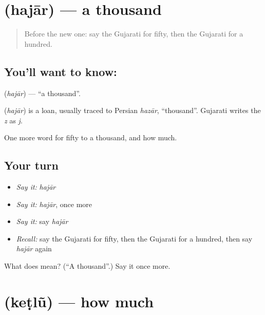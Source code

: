 \section[\texorpdfstring{\gu{હજાર} (hajār)}{હજાર (hajār)}]{ (hajār) — a thousand}

\label{lesson:GU-C83-thousand}



\begin{quote}
Before the new one: say the Gujarati for fifty, then the Gujarati for a hundred.
\end{quote}

\subsection*{You'll want to know: }
\textbf{} (\emph{hajār}) — \textquotedblleft{}a thousand\textquotedblright{}.

\begin{cousinweb}
\textbf{} (\emph{hajār}) is a loan, usually traced to Persian \emph{hazār}, \textquotedblleft{}thousand\textquotedblright{}. Gujarati writes the \emph{z} as \emph{j}.
\end{cousinweb}

\begin{grammarlens}[title={What you've built}]
One more word for fifty to a thousand, and how much.
\end{grammarlens}

\subsection*{Your turn}
\begin{itemize}
\raggedright
  \item \emph{Say it:} \emph{hajār}
  \item \emph{Say it:} \emph{hajār}, once more
  \item \emph{Say it:} say \emph{hajār}
  \item \emph{Recall:} say the Gujarati for fifty, then the Gujarati for a hundred, then say \emph{hajār} again
\end{itemize}

\begin{tcolorbox}[breakable,colback=teal!4,colframe=teal!35!black,title={Before you move on}]
What does  mean? (\textquotedblleft{}A thousand\textquotedblright{}.) Say it once more.
\end{tcolorbox}
\section[\texorpdfstring{\gu{કેટલું} (keṭlũ)}{કેટલું (keṭlũ)}]{ (keṭlũ) — how much}


